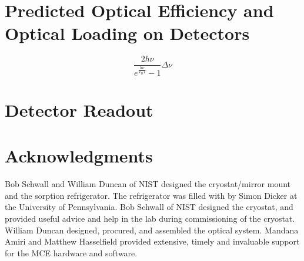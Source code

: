 \section{Predicted Optical Efficiency and Optical Loading on Detectors} \label{sec:ch4-opt-eff}
\begin{equation} \label{eqn:ch4-power-per-mode}
  \frac{2 h \nu}{e^{\frac{h \nu}{k_B T}} -1} \Delta \nu
\end{equation}
\section{Detector Readout} \label{sec:det-readout}

\section{Acknowledgments}

Bob Schwall and William Duncan of NIST designed the cryostat/mirror mount and the  sorption refrigerator.
The refrigerator was filled with  by Simon Dicker at the University of Pennsylvania.
Bob Schwall of NIST designed the cryostat, and provided useful advice and help in the lab during commissioning of the cryostat.
William Duncan designed, procured, and assembled the optical system.
Mandana Amiri and Matthew Hasselfield provided extensive, timely and invaluable support for the MCE hardware and software.

